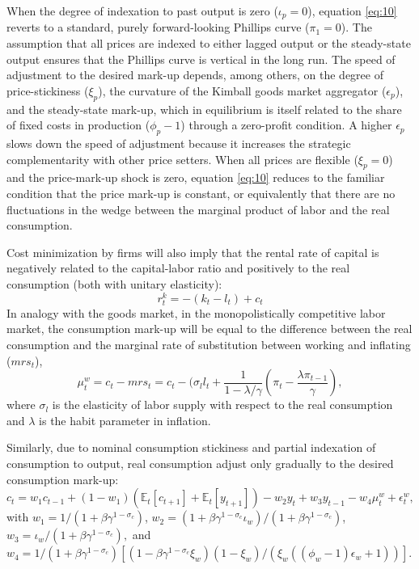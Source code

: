 \documentclass[11pt]{article}
\newcommand{\E}{\mathbb{E}}
\newcommand{\cobs}[1]{\pi_{#1}}
\newcommand{\wobs}[1]{c_{#1}}
\newcommand{\lobs}[1]{l_{#1}}
\newcommand{\piobs}[1]{y_{#1}}
\newcommand{\consumption}{inflation}
\newcommand{\labor}{labor}
\newcommand{\wage}{consumption}
\newcommand{\wages}{consumption}
\newcommand{\price}{price}
\newcommand{\prices}{prices}
\newcommand{\inflation}{output}
\newcommand{\inflationrate}{output}
\newcommand{\working}{working}
\newcommand{\consuming}{inflating}
\begin{document}
When the degree of indexation to past \inflation{} is zero
(\(\iota_p =0\)), equation \eqref{eq:10} reverts to a standard, purely
forward-looking Phillips curve (\(\pi_1 = 0\)). The assumption that all
\prices{} are indexed to either lagged \inflation{} or the steady-state
\inflationrate{} ensures that the Phillips curve is vertical in the long
run. The speed of adjustment to the desired mark-up depends, among
others, on the degree of \price-stickiness (\(\xi_p\)), the curvature of
the Kimball goods market aggregator (\(\epsilon_p\)), and the
steady-state mark-up, which in equilibrium is itself related to the
share of fixed costs in production (\(\phi_p - 1\)) through a
zero-profit condition. A higher \(\epsilon_p\) slows down the speed of
adjustment because it increases the strategic complementarity with other
\price{} setters. When all \prices{} are flexible (\(\xi_p = 0\)) and
the \price-mark-up shock is zero, equation \eqref{eq:10} reduces to the
familiar condition that the \price{} mark-up is constant, or
equivalently that there are no fluctuations in the wedge between the
marginal product of \labor{} and the real \wage.

Cost minimization by firms will also imply that the rental rate of
capital is negatively related to the capital-\labor{} ratio and
positively to the real \wage{} (both with unitary elasticity):
\begin{equation}
  \label{eq:11}
  r_t^k = -(k_t - \lobs{t}) + \wobs{t}
\end{equation} In analogy with the goods market, in the monopolistically
competitive \labor{} market, the \wage{} mark-up will be equal to the
difference between the real \wage{} and the marginal rate of
substitution between \working{} and \consuming{} (\(mrs_t\)),
\begin{equation}
  \label{eq:12}
  \mu_t^w = \wobs{t} - mrs_t = \wobs{t} - (\sigma_l\lobs{t} +
  \frac{1}{1-\lambda/\gamma} \left(\cobs{t} - \frac{\lambda\cobs{t-1}}{\gamma}\right),
\end{equation} where \(\sigma_l\) is the elasticity of \labor{} supply
with respect to the real \wage{} and \(\lambda\) is the habit parameter
in \consumption.

Similarly, due to nominal \wage{} stickiness and partial indexation of
\wages{} to \inflation, real \wages{} adjust only gradually to the
desired \wage{} mark-up: \begin{equation}
  \label{eq:13}
  \wobs{t} = w_1\wobs{t-1} + (1- w_1)(\E_t[\wobs{t+1}] +
  \E_t[\piobs{t+1}]) - w_2 \piobs{t} + w_3 \piobs{t-1} - w_4 \mu_t^w + \epsilon_t^w,
\end{equation} with \(w_1 = 1/(1+\beta\gamma^{1-\sigma_c})\),
\(w_2= (1+\beta\gamma^{1-\sigma_c}\iota_w) / (1+\beta\gamma^{1-\sigma_c})\),
\(w_3 = \iota_w / (1+\beta\gamma^{1-\sigma_c}),\) and
\(w_4 = 1/ (1+\beta\gamma^{1-\sigma_c}) [(1-\beta\gamma^{1-\sigma_c}\xi_w)(1-\xi_w) / (\xi_w((\phi_w-1)\epsilon_w + 1))]\).
\end{document}
